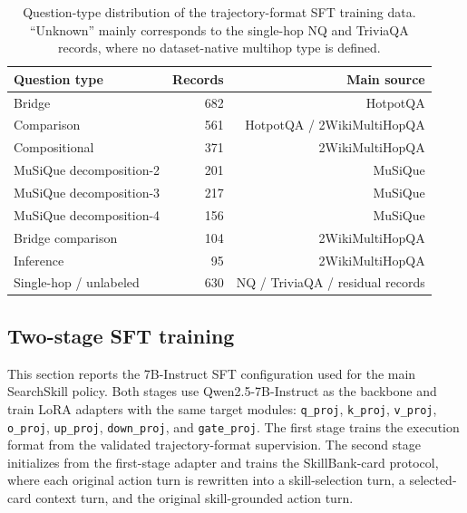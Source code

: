 \documentclass{article}
\begin{document}
\begin{table}[tbp]
  \centering
  \caption{Question-type distribution of the trajectory-format SFT training data. ``Unknown'' mainly corresponds to the single-hop NQ and TriviaQA records, where no dataset-native multihop type is defined.}
  \label{tab:appendix-sft-type-distribution}
  \setlength{\tabcolsep}{6pt}
  \renewcommand{\arraystretch}{1.1}
  \small
  \begin{tabular}{lrr}
    \toprule
    \textbf{Question type} & \textbf{Records} & \textbf{Main source} \\
    \midrule
    Bridge & 682 & HotpotQA \\
    Comparison & 561 & HotpotQA / 2WikiMultiHopQA \\
    Compositional & 371 & 2WikiMultiHopQA \\
    MuSiQue decomposition-2 & 201 & MuSiQue \\
    MuSiQue decomposition-3 & 217 & MuSiQue \\
    MuSiQue decomposition-4 & 156 & MuSiQue \\
    Bridge comparison & 104 & 2WikiMultiHopQA \\
    Inference & 95 & 2WikiMultiHopQA \\
    Single-hop / unlabeled & 630 & NQ / TriviaQA / residual records \\
    \bottomrule
  \end{tabular}
\end{table}

\subsection{Two-stage SFT training}
\label{app:two-stage-sft-training}

This section reports the 7B-Instruct SFT configuration used for the main SearchSkill policy. Both stages use Qwen2.5-7B-Instruct as the backbone and train LoRA adapters with the same target modules: \texttt{q\_proj}, \texttt{k\_proj}, \texttt{v\_proj}, \texttt{o\_proj}, \texttt{up\_proj}, \texttt{down\_proj}, and \texttt{gate\_proj}. The first stage trains the execution format from the validated trajectory-format supervision. The second stage initializes from the first-stage adapter and trains the SkillBank-card protocol, where each original action turn is rewritten into a skill-selection turn, a selected-card context turn, and the original skill-grounded action turn.
\end{document}
